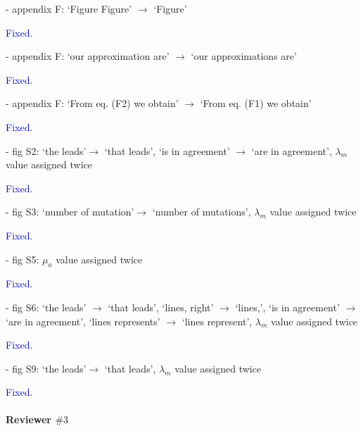 \documentclass[12pt]{extarticle}
\begin{document}
- appendix F: `Figure Figure' $\rightarrow$ `Figure'

\textcolor{blue}{Fixed.} %

- appendix F: `our approximation are' $\rightarrow$ `our approximations are'

\textcolor{blue}{Fixed.}%

- appendix F: `From eq. (F2) we obtain' $\rightarrow$ `From eq. (F1) we obtain'

\textcolor{blue}{Fixed.}%

- fig S2: `the leads'$\rightarrow$ `that leads', `is in agreement' $\rightarrow$ `are in agreement', $\lambda_m$ value assigned twice

\textcolor{blue}{Fixed.}%

- fig S3: `number of mutation'$\rightarrow$ `number of mutations', $\lambda_m$ value assigned twice

\textcolor{blue}{Fixed.}%

- fig S5: $\mu_a$ value assigned twice

\textcolor{blue}{Fixed.} %

- fig S6: `the leads' $\rightarrow$ `that leads', `lines, right' $\rightarrow$ `lines,', `is in agreement' $\rightarrow$ `are in agreement', `lines represents' $\rightarrow$ `lines represent', $\lambda_m$ value assigned twice

\textcolor{blue}{Fixed.} %

- fig S9: `the leads'$\rightarrow$ `that leads', $\lambda_m$ value assigned twice

\textcolor{blue}{Fixed.} %
\\
\\
\textbf{Reviewer $\#3$}



\end{document}
